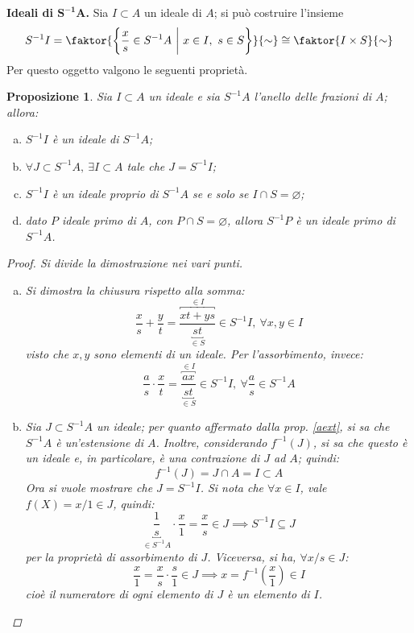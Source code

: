 \documentclass[12pt]{scrartcl}
\theoremstyle{style}
\newtheorem{prop}{Proposizione}[section]
\numberwithin{equation}{subsection}
\renewcommand{\textbf}[1]{\textsf{\bfseries #1}}
\begin{document}
\textbf{Ideali di $\mathbf{S^{-1}A} $.} 
Sia $I \subset A$ un ideale di $A$; si pu\`o costruire l'insieme 
\begin{equation}
	S^{-1}I = \faktor{\left\{ \frac{x}{s} \in S^{-1}A \ \bigg\lvert\ x \in I, \ s \in S \right\} }{\sim} \cong \faktor{I \times S}{\sim}
\end{equation}
Per questo oggetto valgono le seguenti propriet\`a.
\begin{prop}
	Sia $I \subset A$ un ideale e sia $S^{-1}A$ l'anello delle frazioni di $A$; allora:
	\begin{enumerate}[(a).]
		\item $S^{-1}I$ \`e un ideale di $S^{-1}A$;
		\item $\forall J \subset S^{-1}A, \ \exists I\subset A$ tale che $J = S^{-1}I$;
		\item $S^{-1}I$ \`e un ideale proprio di $S^{-1}A$ se e solo se $I \cap S = \varnothing$;
		\item dato $P$ ideale primo di $A$, con $P\cap S = \varnothing$, allora $S^{-1}P$ \`e un ideale primo di $S^{-1}A$.
	\end{enumerate}
	\begin{proof}
		Si divide la dimostrazione nei vari punti.
		\begin{enumerate}[(a).]
			\item Si dimostra la chiusura rispetto alla somma:
				\[
					\frac{x}{s} + \frac{y}{t} = \frac{\overbracket{xt + ys}^{\in I} }{\underbracket{st}_{\in S} }\in S^{-1}I, \ \forall x,y \in I
				\] 
				visto che $x,y$ sono elementi di un ideale.
				Per l'assorbimento, invece:
\[
	\frac{a}{s}\cdot \frac{x}{t} = \frac{\overbracket{ax}^{\in I} }{\underbracket{st}_{\in S} } \in S^{-1}I , \ \forall \frac{a}{s}\in S^{-1}A
\] 
\item Sia $J \subset S^{-1}A$ un ideale; per quanto affermato dalla prop. \ref{aext}, si sa che $S^{-1}A$ \`e un'estensione di $A$.
	Inoltre, considerando $f^{-1}(J)$, si sa che questo \`e un ideale e, in particolare, \`e una contrazione di $J$ ad $A$; quindi:
	\[
	f^{-1}(J) = J\cap A = I \subset A
	\] 
	Ora si vuole mostrare che $J = S^{-1}I$.
	Si nota che $\forall x \in I$, vale $f(X) = x / 1 \in J$, quindi:
	\[
		\underbracket{\frac{1}{s} }_{\in S^{-1}A} \cdot \frac{x}{1}= \frac{x}{s} \in J\implies S^{-1}I \subseteq J
	\] 
	per la propriet\`a di assorbimento di $J$.
	Viceversa, si ha, $\forall x / s \in J$:
	\[
	\frac{x}{1} = \frac{x}{s} \cdot \frac{s}{1} \in J\implies x = f^{-1}\left(\frac{x}{1}\right) \in I
	\] 
	cio\`e il numeratore di ogni elemento di $J$ \`e un elemento di $I$.

\end{enumerate}
\end{proof}
\end{prop}
\end{document}
